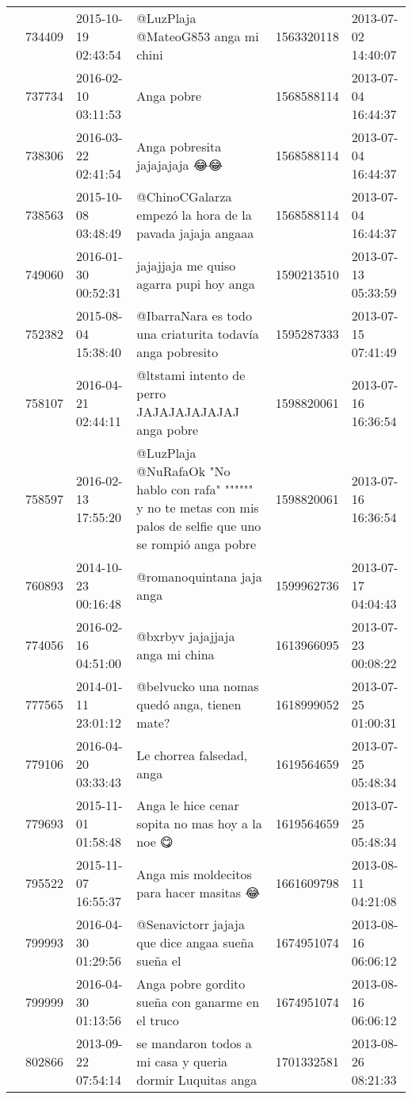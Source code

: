 \begin{tabular}{llllrl}
 & 734409& 2015-10-19 02:43:54 & @LuzPlaja @MateoG853 anga mi chini💞😂😂😂 &1563320118 & 2013-07-02 14:40:07 \\
 & 737734& 2016-02-10 03:11:53 & Anga pobre &1568588114 & 2013-07-04 16:44:37 \\
 & 738306& 2016-03-22 02:41:54 & Anga pobresita jajajajaja 😂😂 &1568588114 & 2013-07-04 16:44:37 \\
 & 738563& 2015-10-08 03:48:49 & @ChinoCGalarza empezó la hora de la pavada jajaja angaaa &1568588114 & 2013-07-04 16:44:37 \\
 & 749060& 2016-01-30 00:52:31 &jajajjaja me quiso agarra pupi hoy anga &1590213510 & 2013-07-13 05:33:59 \\
 & 752382& 2015-08-04 15:38:40 &@IbarraNara es todo una criaturita todavía anga pobresito &1595287333 & 2013-07-15 07:41:49 \\
 & 758107& 2016-04-21 02:44:11 & @ltstami intento de perro JAJAJAJAJAJAJ anga pobre &1598820061 & 2013-07-16 16:36:54 \\
 & 758597& 2016-02-13 17:55:20 &@LuzPlaja @NuRafaOk "No hablo con rafa" """""" y no te metas con mis palos de selfie que uno se rompió anga pobre &1598820061 & 2013-07-16 16:36:54 \\
 & 760893& 2014-10-23 00:16:48 &@romanoquintana jaja anga &1599962736 & 2013-07-17 04:04:43 \\
 & 774056& 2016-02-16 04:51:00 &@bxrbyv jajajjaja anga mi china &1613966095 & 2013-07-23 00:08:22 \\
 & 777565& 2014-01-11 23:01:12 & @belvucko una nomas quedó anga, tienen mate? &1618999052 & 2013-07-25 01:00:31 \\
 & 779106& 2016-04-20 03:33:43 &Le chorrea falsedad, anga &1619564659 & 2013-07-25 05:48:34 \\
 & 779693& 2015-11-01 01:58:48 &Anga le hice cenar sopita no mas hoy a la noe 😋 &1619564659 & 2013-07-25 05:48:34 \\
 & 795522& 2015-11-07 16:55:37 & Anga mis moldecitos para hacer masitas 😂 &1661609798 & 2013-08-11 04:21:08 \\
 & 799993& 2016-04-30 01:29:56 &@Senavictorr jajaja que dice angaa sueña sueña el &1674951074 & 2013-08-16 06:06:12 \\
 & 799999& 2016-04-30 01:13:56 & Anga pobre gordito sueña con ganarme en el truco &1674951074 & 2013-08-16 06:06:12 \\
 & 802866& 2013-09-22 07:54:14 &se mandaron todos a mi casa y queria dormir Luquitas anga &1701332581 & 2013-08-26 08:21:33 \\

\end{tabular}
